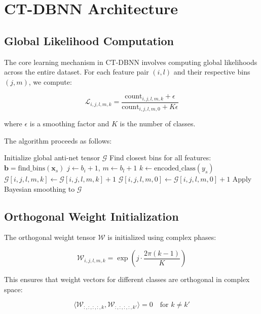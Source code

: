 \documentclass[journal]{IEEEtran}
\begin{document}
\section{CT-DBNN Architecture}

\subsection{Global Likelihood Computation}

The core learning mechanism in CT-DBNN involves computing global likelihoods across the entire dataset. For each feature pair $(i,l)$ and their respective bins $(j,m)$, we compute:

\begin{equation}
\mathcal{L}_{i,j,l,m,k} = \frac{\text{count}_{i,j,l,m,k} + \epsilon}{\text{count}_{i,j,l,m,0} + K\epsilon}
\end{equation}

where $\epsilon$ is a smoothing factor and $K$ is the number of classes.

The algorithm proceeds as follows:

\begin{algorithmic}[1]
\STATE Initialize global anti-net tensor $\mathcal{G}$
\STATE Find closest bins for all features: $\mathbf{b} = \text{find\_bins}(\mathbf{x}_s)$
\STATE $j \gets b_i + 1$, $m \gets b_l + 1$
\STATE $k \gets \text{encoded\_class}(y_s)$
\STATE $\mathcal{G}[i,j,l,m,k] \gets \mathcal{G}[i,j,l,m,k] + 1$
\STATE $\mathcal{G}[i,j,l,m,0] \gets \mathcal{G}[i,j,l,m,0] + 1$
\ENDFOR
\ENDFOR
\STATE Apply Bayesian smoothing to $\mathcal{G}$
\end{algorithmic}

\subsection{Orthogonal Weight Initialization}

The orthogonal weight tensor $\mathcal{W}$ is initialized using complex phases:

\begin{equation}
\mathcal{W}_{i,j,l,m,k} = \exp\left(j \cdot \frac{2\pi(k-1)}{K}\right)
\end{equation}

This ensures that weight vectors for different classes are orthogonal in complex space:

\begin{equation}
\langle \mathcal{W}_{:,:,:,:,k}, \mathcal{W}_{:,:,:,:,k'} \rangle = 0 \quad \text{for } k \neq k'
\end{equation}
\end{document}
